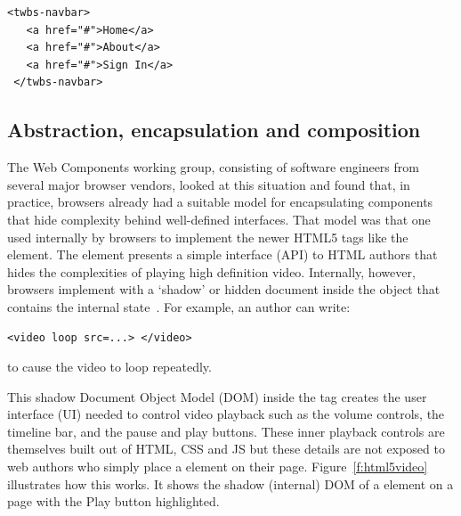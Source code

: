 \begin{lstlisting}[language=HTML5,caption={Hypothetical Bootstrap nav bar custom element.},label=l:twbs2]
 <twbs-navbar>
   <a href="#">Home</a>
   <a href="#">About</a>
   <a href="#">Sign In</a>
 </twbs-navbar>
\end{lstlisting}

\subsection{Abstraction, encapsulation and composition}

The Web Components working group, consisting of software engineers from several major browser vendors, 
looked at this situation and found that, in practice, browsers already had a suitable model for encapsulating components that hide complexity behind well-defined interfaces.
That model was that one used internally by browsers to implement the newer 
HTML5 tags 
like the \textbf{} element. 
The  element presents a simple interface (API) to HTML authors that hides the complexities of playing high definition video.
Internally, however, browsers implement  with a `shadow' or hidden document inside the object that contains the internal state~\cite{kitamura2014}. 
For example, an author can write:
\begin{lstlisting}[language=HTML5,numbers=none]
	<video loop src=...> </video>
\end{lstlisting}
to cause the video to loop repeatedly.

This shadow Document Object Model (DOM) inside the 
 tag creates the user interface (UI) needed to control video playback such as the volume controls, the timeline bar, and the pause and play buttons.
These inner playback controls are themselves built out of HTML, CSS and JS but these details are not exposed to web authors who simply place a  element on their page. 
Figure~\ref{f:html5video} illustrates how this works. It shows the shadow (internal) DOM of a  element on a page with the Play button  highlighted.


